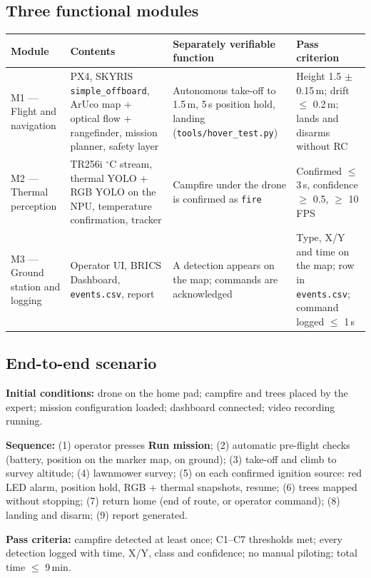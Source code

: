\documentclass[10pt,a4paper]{article}
\newcommand{\head}[1]{\textbf{#1}}
\newcommand{\file}[1]{\texttt{\small #1}}
\begin{document}
\subsection{Three functional modules}
\begin{tabularx}{\textwidth}{|L{2.6cm}|L{4.5cm}|L{4.0cm}|Y|}
\hline
{}\head{Module} & \head{Contents} & \head{Separately verifiable function} & \head{Pass criterion} \\ \hline
M1 --- Flight and navigation & PX4, SKYRIS \texttt{simple\_offboard}, ArUco map + optical flow + rangefinder, mission planner, safety layer & Autonomous take-off to 1.5\,m, 5\,s position hold, landing (\file{tools/hover\_test.py}) & Height 1.5 $\pm$ 0.15\,m; drift $\le$ 0.2\,m; lands and disarms without RC \\ \hline
M2 --- Thermal perception & TR256i $^\circ$C stream, thermal YOLO + RGB YOLO on the NPU, temperature confirmation, tracker & Campfire under the drone is confirmed as \texttt{fire} & Confirmed $\le$ 3\,s, confidence $\ge$ 0.5, $\ge$ 10\,FPS \\ \hline
M3 --- Ground station and logging & Operator UI, BRICS Dashboard, \file{events.csv}, report & A detection appears on the map; commands are acknowledged & Type, X/Y and time on the map; row in \file{events.csv}; command logged $\le$ 1\,s \\ \hline
\end{tabularx}

\subsection{End-to-end scenario}
\textbf{Initial conditions:} drone on the home pad; campfire and trees placed by the expert; mission configuration loaded;
dashboard connected; video recording running.

\textbf{Sequence:} (1) operator presses \textbf{Run mission}; (2) automatic pre-flight checks (battery, position on the
marker map, on ground); (3) take-off and climb to survey altitude; (4) lawnmower survey; (5) on each confirmed ignition
source: red LED alarm, position hold, RGB + thermal snapshots, resume; (6) trees mapped without stopping;
(7) return home (end of route, or operator command); (8) landing and disarm; (9) report generated.

\textbf{Pass criteria:} campfire detected at least once; C1--C7 thresholds met; every detection logged with time, X/Y,
class and confidence; no manual piloting; total time $\le$ 9\,min.
\end{document}
